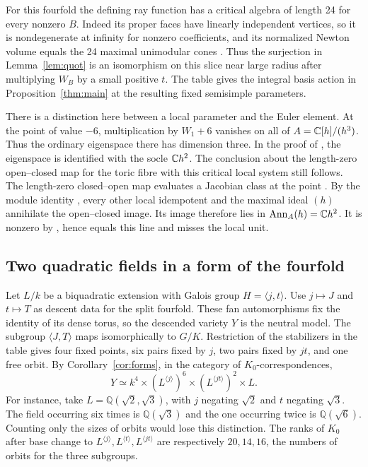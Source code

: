 For this fourfold the defining ray function has a critical algebra of length 24 for every nonzero $B$. Indeed its proper faces have linearly independent vertices, so it is nondegenerate at infinity for nonzero coefficients, and its normalized Newton volume equals the 24 maximal unimodular cones \cite[Lemma~2.8 and proof of Theorem~2.14]{RS}. Thus the surjection in Lemma~\ref{lem:quot} is an isomorphism on this slice near large radius after multiplying $W_B$ by a small positive $t$. The table gives the integral basis action in Proposition~\ref{thm:main} at the resulting fixed semisimple parameters.

There is a distinction here between a local parameter and the Euler element. At the point of value $-6$, multiplication by $W_1+6$ vanishes on all of $A=\mathbb C[h]/(h^3)$. Thus the ordinary eigenspace there has dimension three. In the proof of \cite[Corollary~6.21]{Rit}, the eigenspace is identified with the socle $\mathbb C h^2$. The conclusion about the length-zero open--closed map for the toric fibre with this critical local system still follows. The length-zero closed--open map evaluates a Jacobian class at the point \cite[Lemma~4.1]{Ton}. By the module identity \cite[\S2.6 and Appendix~A.4]{She}, every other local idempotent and the maximal ideal $(h)$ annihilate the open--closed image. Its image therefore lies in $\mathrm{Ann}_A(h)=\mathbb C h^2$. It is nonzero by \cite[Lemma~6.8(1)]{Rit}, hence equals this line and misses the local unit.

\subsection{Two quadratic fields in a form of the fourfold}
Let $L/k$ be a biquadratic extension with Galois group $H=\langle j,t\rangle$. Use $j\mapsto J$ and $t\mapsto T$ as descent data for the split fourfold. These fan automorphisms fix the identity of its dense torus, so the descended variety $Y$ is the neutral model. The subgroup $\langle J,T\rangle$ maps isomorphically to $G/K$. Restriction of the stabilizers in the table gives four fixed points, six pairs fixed by $j$, two pairs fixed by $jt$, and one free orbit. By Corollary~\ref{cor:forms}, in the category of $K_0$-correspondences,
\[
       Y\simeq k^4\times (L^{\langle j\rangle})^6
                       \times (L^{\langle jt\rangle})^2\times L .
\]
For instance, take $L=\mathbb Q(\sqrt{2},\sqrt{3})$, with $j$ negating $\sqrt{2}$ and $t$ negating $\sqrt{3}$. The field occurring six times is $\mathbb Q(\sqrt{3})$ and the one occurring twice is $\mathbb Q(\sqrt{6})$. Counting only the sizes of orbits would lose this distinction. The ranks of $K_0$ after base change to $L^{\langle j\rangle},L^{\langle t\rangle},L^{\langle jt\rangle}$ are respectively $20,14,16$, the numbers of orbits for the three subgroups.

